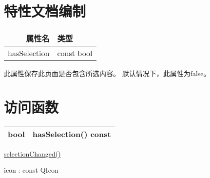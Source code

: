 \section{特性文档编制}

\begin{tabular}{|r|l|}
	\hline
	属性名&  类型\\
	\hline
	hasSelection&	const bool\\
	\hline
\end{tabular}

此属性保存此页面是否包含所选内容。 默认情况下，此属性为false。

\section{访问函数}

\begin{tabular}{|r|l|}
	\hline
	bool&  hasSelection() const\\
	\hline
\end{tabular}

\begin{notice}[另请参阅]
	\href{https://doc.qt.io/qt-5/qwebengineview.html#selectionChanged}{selectionChanged()}
\end{notice}

icon : const QIcon








